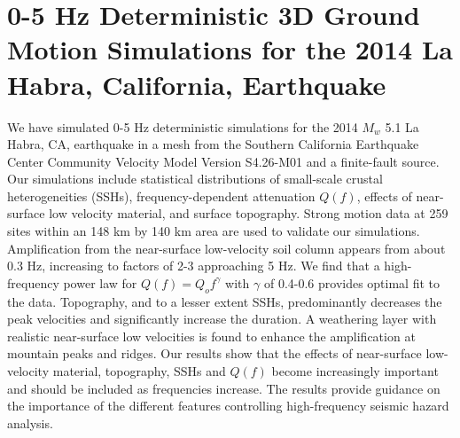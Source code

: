 \newcommand{\red}[1]{\textcolor{red}{#1}}
\newcommand{\blue}[1]{\textcolor{blue}{#1}}
\newcommand{\green}[1]{\textcolor{green}{#1}}
\newcommand{\purple}[1]{\textcolor{purple}{#1}}

\linespread{1.7}
\chapter{0-5 Hz Deterministic 3D Ground Motion Simulations for the 2014 La Habra, California, Earthquake}
\linespread{2.0}
\label{chap:highf}

\graphicspath{{/Users/zhh076/work/PhD_way/high_f/}}

We have simulated 0-5 Hz deterministic simulations for the 2014 $M_w$ 5.1 La Habra, CA, earthquake in a mesh from the Southern California Earthquake Center Community Velocity Model Version S4.26-M01 and a finite-fault source. Our simulations include statistical distributions of small-scale crustal heterogeneities (SSHs), frequency-dependent attenuation $Q(f)$, effects of near-surface low velocity material, and surface topography. Strong motion data at 259 sites within an 148 km by 140 km area are used to validate our simulations.  Amplification from the near-surface low-velocity soil column appears from about 0.3 Hz, increasing to factors of 2-3 approaching 5 Hz. We find that a high-frequency power law for $Q(f)=Q_o f^{\gamma}$ with $\gamma$ of 0.4-0.6 provides optimal fit to the data. Topography, and to a lesser extent SSHs, predominantly decreases the peak velocities and significantly increase the duration. A weathering layer with realistic near-surface low velocities is found to enhance the amplification at mountain peaks and ridges. Our results show that the effects of near-surface low-velocity material, topography, SSHs and $Q(f)$ become increasingly important and should be included as frequencies increase. The results provide guidance on the importance of the different features controlling high-frequency seismic hazard analysis.


